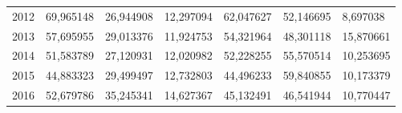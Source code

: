 \begin{table}
\begin{tabular}{p{1cm}p{2cm}p{2cm}p{2cm}p{2cm}p{2cm}p{2cm}}
 2012 &       69,965148 &    26,944908 &                                   12,297094 & 62,047627 & 52,146695 &                       8,697038 \\
 2013 &       57,695955 &    29,013376 &                                   11,924753 & 54,321964 & 48,301118 &                      15,870661 \\
 2014 &       51,583789 &    27,120931 &                                   12,020982 & 52,228255 & 55,570514 &                      10,253695 \\
 2015 &       44,883323 &    29,499497 &                                   12,732803 & 44,496233 & 59,840855 &                      10,173379 \\
 2016 &       52,679786 &    35,245341 &                                   14,627367 & 45,132491 & 46,541944 &                      10,770447 \\
\bottomrule
\end{tabular}
\end{table}
